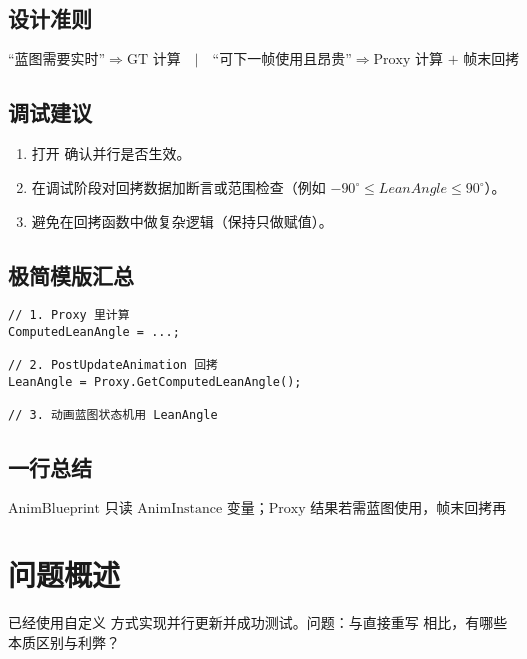 \documentclass[10pt,openright,oneside,CJKmath]{MyBook}
\begin{document}
\subsection{设计准则}
\[
\text{“蓝图需要实时”} \Rightarrow \text{GT 计算} \quad|\quad
\text{“可下一帧使用且昂贵”} \Rightarrow \text{Proxy 计算 + 帧末回拷}
\]

\subsection{调试建议}
\begin{enumerate}
  \item 打开  确认并行是否生效。
  \item 在调试阶段对回拷数据加断言或范围检查（例如 \(-90^\circ \le LeanAngle \le 90^\circ\)）。
  \item 避免在回拷函数中做复杂逻辑（保持只做赋值）。
\end{enumerate}

\subsection{极简模版汇总}
\begin{lstlisting}[style=cpp]
// 1. Proxy 里计算
ComputedLeanAngle = ...;

// 2. PostUpdateAnimation 回拷
LeanAngle = Proxy.GetComputedLeanAngle();

// 3. 动画蓝图状态机用 LeanAngle
\end{lstlisting}

\subsection{一行总结}
\[
\boxed{\text{AnimBlueprint 只读 AnimInstance 变量；Proxy 结果若需蓝图使用，帧末回拷再生效。}}
\]

\section{问题概述}
已经使用自定义  方式实现并行更新并成功测试。问题：与直接重写  相比，有哪些本质区别与利弊？
\end{document}
